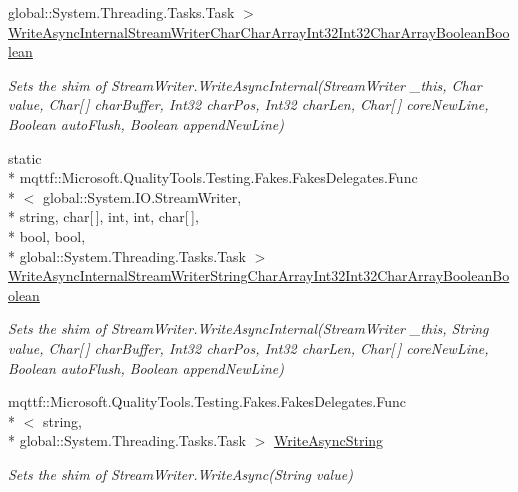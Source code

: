 \begin{DoxyCompactItemize}
global\-::\-System.\-Threading.\-Tasks.\-Task $>$ \hyperlink{class_system_1_1_i_o_1_1_fakes_1_1_shim_stream_writer_a5d261bb915a7467b37fb07caca455b2b}{Write\-Async\-Internal\-Stream\-Writer\-Char\-Char\-Array\-Int32\-Int32\-Char\-Array\-Boolean\-Boolean}
\begin{DoxyCompactList}\small\item\em Sets the shim of Stream\-Writer.\-Write\-Async\-Internal(\-Stream\-Writer \-\_\-this, Char value, Char\mbox{[}$\,$\mbox{]} char\-Buffer, Int32 char\-Pos, Int32 char\-Len, Char\mbox{[}$\,$\mbox{]} core\-New\-Line, Boolean auto\-Flush, Boolean append\-New\-Line)\end{DoxyCompactList}\item 
static \\*
mqttf\-::\-Microsoft.\-Quality\-Tools.\-Testing.\-Fakes.\-Fakes\-Delegates.\-Func\\*
$<$ global\-::\-System.\-I\-O.\-Stream\-Writer, \\*
string, char\mbox{[}$\,$\mbox{]}, int, int, char\mbox{[}$\,$\mbox{]}, \\*
bool, bool, \\*
global\-::\-System.\-Threading.\-Tasks.\-Task $>$ \hyperlink{class_system_1_1_i_o_1_1_fakes_1_1_shim_stream_writer_a1896792429e2f3addfde6824de314c4d}{Write\-Async\-Internal\-Stream\-Writer\-String\-Char\-Array\-Int32\-Int32\-Char\-Array\-Boolean\-Boolean}
\begin{DoxyCompactList}\small\item\em Sets the shim of Stream\-Writer.\-Write\-Async\-Internal(\-Stream\-Writer \-\_\-this, String value, Char\mbox{[}$\,$\mbox{]} char\-Buffer, Int32 char\-Pos, Int32 char\-Len, Char\mbox{[}$\,$\mbox{]} core\-New\-Line, Boolean auto\-Flush, Boolean append\-New\-Line)\end{DoxyCompactList}\item 
mqttf\-::\-Microsoft.\-Quality\-Tools.\-Testing.\-Fakes.\-Fakes\-Delegates.\-Func\\*
$<$ string, \\*
global\-::\-System.\-Threading.\-Tasks.\-Task $>$ \hyperlink{class_system_1_1_i_o_1_1_fakes_1_1_shim_stream_writer_a3939d0f2637e3aefec732b6ea6cf156b}{Write\-Async\-String}
\begin{DoxyCompactList}\small\item\em Sets the shim of Stream\-Writer.\-Write\-Async(\-String value)\end{DoxyCompactList}\item 

\end{DoxyCompactItemize}
